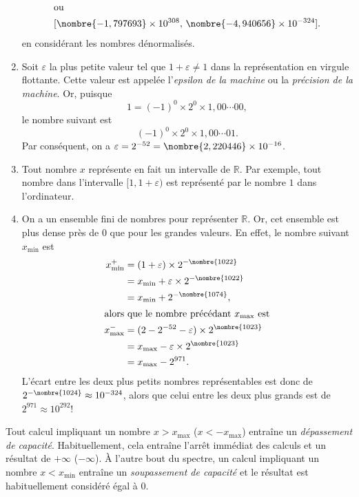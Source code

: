 \documentclass[letterpaper,11pt]{memoir}
\theoremstyle{plain}
\theoremstyle{definition}
\theoremstyle{remark}
\begin{document}
\begin{enumerate}
\begin{gather*}
    \intertext{ou}
    [\nombre{-1,797693} \times 10^{308},\,
     \nombre{-4,940656} \times 10^{-324}].
  \end{gather*}
  en considérant les nombres dénormalisés.
\item Soit $\varepsilon$ la plus petite valeur tel que $1 +
  \varepsilon \neq 1$ dans la représentation en virgule flottante.
  Cette valeur est appelée l'\emph{epsilon de la machine} ou la
  \emph{précision de la machine}. Or, puisque
  \begin{equation*}
    1 = (-1)^0 \times 2^0 \times 1,00\cdots00,
  \end{equation*}
  le nombre suivant est
  \begin{equation*}
    (-1)^0 \times 2^0 \times 1,00\cdots01.
  \end{equation*}
  Par conséquent, on a $\varepsilon = 2^{-52} = \nombre{2,220446}
  \times 10^{-16}$.
\item Tout nombre $x$ représente en fait un intervalle de
  $\mathbb{R}$. Par exemple, tout nombre dans l'intervalle $[1, 1 +
  \varepsilon)$ est représenté par le nombre $1$ dans l'ordinateur.
\item On a un ensemble fini de nombres pour représenter $\mathbb{R}$.
  Or, cet ensemble est plus dense près de $0$ que pour les grandes
  valeurs. En effet, le nombre suivant $x_{\text{min}}$ est
  \begin{align*}
    x_{\text{min}}^+
    &= (1 + \varepsilon) \times 2^{-\nombre{1022}} \\
    &= x_{\text{min}} + \varepsilon \times 2^{-\nombre{1022}} \\
    &= x_{\text{min}} + 2^{-\nombre{1074}}, \\
    \intertext{alors que le nombre précédant $x_{\text{max}}$ est}
    x_{\text{max}}^-
    &= (2 - 2^{-52} - \varepsilon) \times 2^{\nombre{1023}} \\
    &= x_{\text{max}} - \varepsilon \times 2^{\nombre{1023}} \\
    &= x_{\text{max}} - 2^{971}.
  \end{align*}
  L'écart entre les deux plus petits nombres représentables est donc de
  $2^{-\nombre{1024}} \approx 10^{-324}$, alors que celui entre les deux plus
  grands est de $2^{971} \approx 10^{292}$!
\end{enumerate}

Tout calcul impliquant un nombre $x > x_{\text{max}}$ ($x <
-x_{\text{max}}$) entraîne un \emph{dépassement de capacité}.
Habituellement, cela entraîne l'arrêt immédiat des calculs et un
résultat de $+\infty$ ($-\infty$). À l'autre bout du spectre, un
calcul impliquant un nombre $x < x_{\text{min}}$ entraîne un
\emph{soupassement de capacité} et le résultat est habituellement
considéré égal à $0$.
\end{document}
